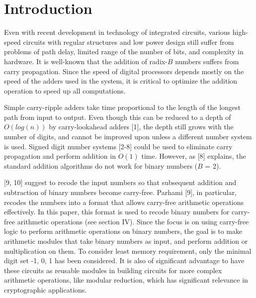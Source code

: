 \documentclass[conference]{IEEEtran}
\begin{document}

%
\IEEEpeerreviewmaketitle


\section{Introduction}

Even with recent development in technology of integrated circuits, various high-speed circuits with regular structures and low power design still suffer from problems of path delay, limited range of the number of bits, and complexity in hardware. It is well-known that the addition of radix-$B$ numbers suffers from carry propagation. Since the speed of digital processors depends mostly on the speed of the adders used in the system, it is critical to optimize the addition operation to speed up all computations.

Simple carry-ripple adders take time proportional to the length of the longest path from input to output. Even though this can be reduced to a depth of $O(log(n))$ by carry-lookahead adders [1], the depth still grows with the number of digits, and cannot be improved upon unless a different number system is used. Signed digit number systems [2-8] could be used to eliminate carry propagation and perform addition in $O(1)$ time. However, as [8] explains, the standard addition algorithms do not work for binary numbers ($B$ = 2).

[9, 10] suggest to recode the input numbers so that subsequent addition and subtraction of binary numbers become carry-free. Parhami [9], in particular, recodes the numbers into a format that allows carry-free arithmetic operations effectively. In this paper, this format is used to recode binary numbers for carry-free arithmetic operations (see section IV). Since the focus is on using carry-free logic to perform arithmetic operations on binary numbers, the goal is to make arithmetic modules that take binary numbers as input, and perform addition or multiplication on them. To consider least memory requirement, only the minimal digit set {-1, 0, 1} has been considered. It is also of significant advantage to have these circuits as reusable modules in building circuits for more complex arithmetic operations, like modular reduction, which has significant relevance in cryptographic applications.
\end{document}
